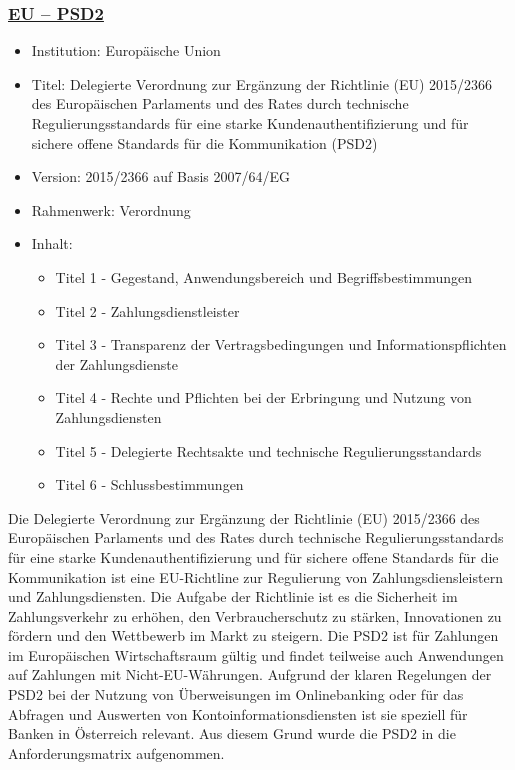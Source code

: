 \subsubsection{\underline{EU – PSD2}}
\begin{itemize}
    \item Institution: Europäische Union
    \item Titel: Delegierte Verordnung zur Ergänzung der Richtlinie (EU) 2015/2366 des Europäischen Parlaments und des Rates durch technische Regulierungsstandards für eine starke Kundenauthentifizierung und für sichere offene Standards für die Kommunikation (PSD2) \autocite{EU_PSD2}
    \item Version: 2015/2366 auf Basis 2007/64/EG
    \item Rahmenwerk: Verordnung
    \item Inhalt:
    \begin{itemize}
        \item Titel 1 - Gegestand, Anwendungsbereich und Begriffsbestimmungen
        \item Titel 2 - Zahlungsdienstleister
        \item Titel 3 - Transparenz der Vertragsbedingungen und Informationspflichten der Zahlungsdienste
        \item Titel 4 - Rechte und Pflichten bei der Erbringung und Nutzung von Zahlungsdiensten
        \item Titel 5 - Delegierte Rechtsakte und technische Regulierungsstandards
        \item Titel 6 - Schlussbestimmungen
    \end{itemize}
\end{itemize}
\bigbreak
Die \glqq{}Delegierte Verordnung zur Ergänzung der Richtlinie (EU) 2015/2366 des Europäischen Parlaments und des Rates durch technische Regulierungsstandards für eine starke Kundenauthentifizierung und für sichere offene Standards für die Kommunikation\grqq{} ist eine EU-Richtline zur Regulierung von Zahlungsdiensleistern und Zahlungsdiensten. Die Aufgabe der Richtlinie ist es die Sicherheit im Zahlungsverkehr zu erhöhen, den Verbraucherschutz zu stärken, Innovationen zu fördern und den Wettbewerb im Markt zu steigern. Die PSD2 ist für Zahlungen im Europäischen Wirtschaftsraum gültig und findet teilweise auch Anwendungen auf Zahlungen mit Nicht-EU-Währungen. Aufgrund der klaren Regelungen der PSD2 bei der Nutzung von Überweisungen im Onlinebanking oder für das Abfragen und Auswerten von Kontoinformationsdiensten ist sie speziell für Banken in Österreich relevant. Aus diesem Grund wurde die PSD2 in die Anforderungsmatrix aufgenommen. 

